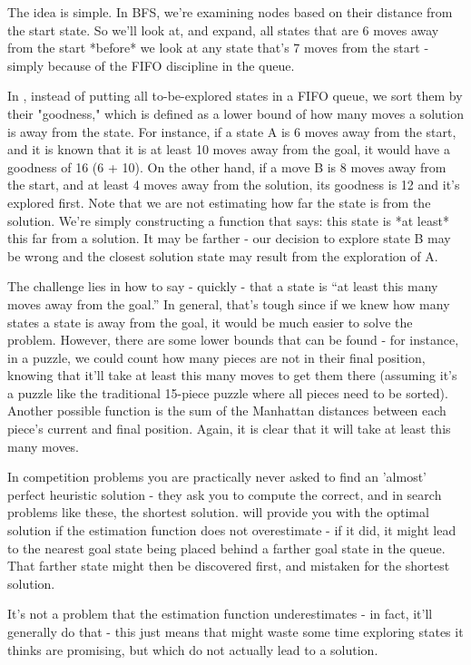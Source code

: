 The idea is simple.  In BFS, we're examining nodes based on their distance from the start state. 
So we'll look at, and expand, all states that are 6 moves away from the start *before* we 
look at any state that's 7 moves from the start - simply because of the FIFO discipline in the queue.

In \astar, instead of putting all to-be-explored states in a FIFO queue,
we sort them by their "goodness," which is defined as a
lower bound of how many moves a solution is away from the state.
For instance, if a state A is 6 moves away from the start, and
it is known that it is at least 10 moves away from the goal,
it would have a goodness of 16 (6 + 10).  On the other hand, if a
move B is 8 moves away from the start, and at least 4 moves away
from the solution, its goodness is 12 and it's explored first.
Note that we are not estimating how far the state is from
the solution. We're simply constructing a function that says: this
state is *at least* this far from a solution. It may be farther -
our decision to explore state B may be wrong and the closest solution
state may result from the exploration of A.

The challenge lies in how to say - quickly - that a state is
``at least this many moves away from the goal.''  In general, that's
tough since if we knew how many states a state is away from the goal,
it would be much easier to solve the problem. However, there are some lower
bounds that can be found - for instance, in a puzzle, we could count how
many pieces are not in their final position, knowing that it'll take at
least this many moves to get them there (assuming it's a puzzle like
the traditional 15-piece puzzle where all pieces need to be sorted).
Another possible function is the sum of the Manhattan
distances between each piece's current and final position.  
Again, it is clear that it will take at least this many moves.

In competition problems you are practically never asked to find an 'almost'
perfect heuristic solution - they ask
you to compute the correct, and in search problems like these, the
shortest solution.  \astar{} will provide you with the optimal
solution if the estimation function does not overestimate  - if it
did, it might lead to the nearest goal state being placed behind a
farther goal state in the queue.  That farther state might then be
discovered first, and mistaken for the shortest solution.

It's not a problem that the estimation function underestimates - in fact,
it'll generally do that - this just means that \astar might waste some
time exploring states it thinks are promising, but which do not actually
lead to a solution.

